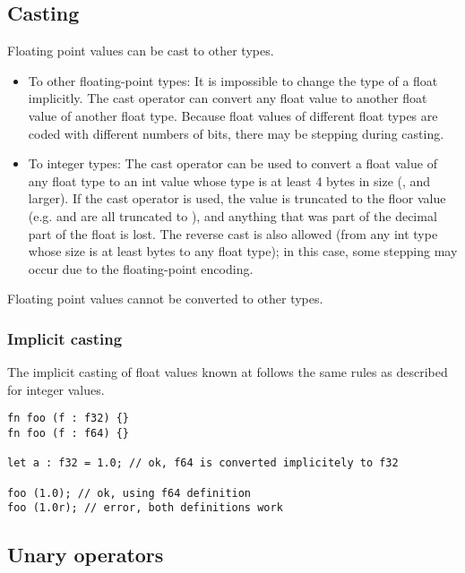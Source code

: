 \subsection{Casting}
\label{sec:org9eacb07}

Floating point values can be cast to other types.

\begin{itemize}
\item To other floating-point types: It is impossible to change the type of a
  float implicitly. The cast operator  can convert any float
  value to another float value of another float type. Because float values of
  different float types are coded with different numbers of bits, there may be
  stepping during casting.

\item To integer types: The cast operator can be used to convert a float value
  of any float type to an int value whose type is at least 4 bytes in size
  (,  and larger). If the cast operator is used, the
  value is truncated to the floor value (e.g.   and
   are all truncated to ), and anything that was part of
  the decimal part of the float is lost. The reverse cast is also allowed (from
  any int type whose size is at least  bytes to any float type); in
  this case, some stepping may occur due to the floating-point encoding.

\end{itemize}

Floating point values cannot be converted to other types.
\subsubsection{Implicit casting}

The implicit casting of float values known at  follows the same
rules as described for integer  values.

\begin{lstlisting}[style=coloredverbatim]
fn foo (f : f32) {}
fn foo (f : f64) {}

let a : f32 = 1.0; // ok, f64 is converted implicitely to f32

foo (1.0); // ok, using f64 definition
foo (1.0r); // error, both definitions work
\end{lstlisting}

\subsection{Unary operators}
\label{sec:org30770bf}

